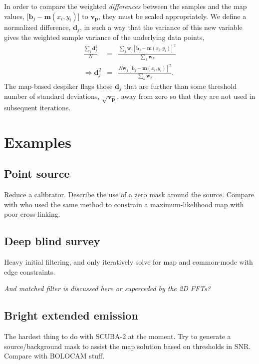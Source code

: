 \documentclass[useAMS,usenatbib,nofootinbib]{mn2e}
\newcommand{\snr}{SNR}
\begin{document}
In order to compare the weighted \emph{differences} between the
samples and the map values, [$\mathbf{b}_j - \mathbf{m}(x_i,y_i)$] to
$\mathbf{v_p}$, they must be scaled appropriately. We define a
normalized difference, $\mathbf{d}_j$, in such a way that the variance
of this new variable gives the weighted sample variance of the
underlying data points,
%
\begin{eqnarray}
  \frac{\sum_j \mathbf{d}_j^2}{N} &=&
  \frac{\sum_j \mathbf{w}_j [\mathbf{b}_j - \mathbf{m}(x_i,y_i)]^2}
       {\sum_k \mathbf{w}_k} \\
   \Rightarrow \mathbf{d}_j^2 &=& \frac{N \mathbf{w}_j [\mathbf{b}_j -
       \mathbf{m}(x_i,y_i)]^2}{ \sum_k \mathbf{w}_k} .
\end{eqnarray}
%
The map-based despiker flags those $\mathbf{d}_j$ that are further
than some threshold number of standard deviations,
$\sqrt{\mathbf{v_p}}$, away from zero so that they are not used in
subsequent iterations.


\section{Examples}
\label{sec:examples}

\subsection{Point source}
Reduce a calibrator. Describe the use of a zero mask around the
source. Compare with \citet{wiebe2009} who used the same method to
constrain a maximum-likelihood map with poor cross-linking.

\subsection{Deep blind survey}
Heavy initial filtering, and only iteratively solve for map and
common-mode with edge constraints.

\textit{And matched filter is discussed here or superceded by
the 2D FFTs?}

\subsection{Bright extended emission}
The hardest thing to do with SCUBA-2 at the moment. Try to generate a
source/background mask to assist the map solution based on thresholds
in \snr. Compare with BOLOCAM stuff.
\end{document}
